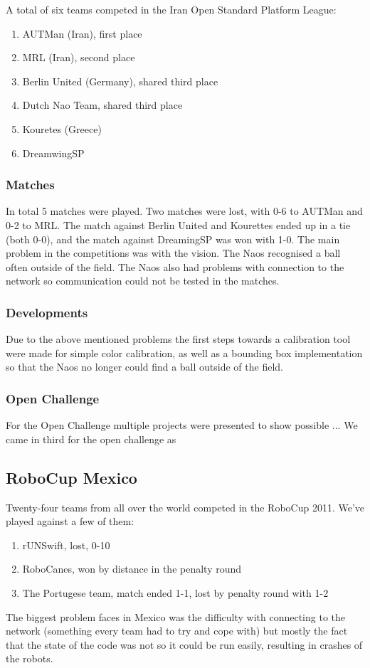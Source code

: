 \documentclass[11pt,a4paper,oneside]{article}
\begin{document}
A total of six teams competed in the Iran Open Standard Platform League:
\begin{enumerate}
\item AUTMan (Iran), first place
\item MRL (Iran), second place
\item Berlin United (Germany), shared third place
\item Dutch Nao Team, shared third place
\item Kouretes (Greece)
\item DreamwingSP
\end{enumerate}

\subsubsection{Matches}
In total 5 matches were played. Two matches were lost, with 0-6 to AUTMan and 0-2 to MRL. The match against Berlin United and Kourettes ended up in a tie (both 0-0), and the match against DreamingSP was won with 1-0.
The main problem in the competitions was with the vision. The Naos recognised a ball often outside of the field. The Naos also had problems with connection to the network so communication could not be tested in the matches.

\subsubsection{Developments}
Due to the above mentioned problems the first steps towards a calibration tool were made for simple color calibration, as well as a bounding box implementation so that the Naos no longer could find a ball outside of the field.

\subsubsection{Open Challenge}
\label{sec:zoneblocking}

For the Open Challenge multiple projects were presented to show  possible ...
We came in third for the open challenge as 

\subsection{RoboCup Mexico}

Twenty-four teams from all over the world competed in the RoboCup 2011. We've played against a few of them:
\begin{enumerate}
\item rUNSwift, lost, 0-10
\item RoboCanes, won by distance in the penalty round
\item The Portugese team, match ended 1-1, lost by penalty round with 1-2
\end{enumerate}
The biggest problem faces in Mexico was the difficulty with connecting to the network (something every team had to try and cope with) but mostly the fact that the state of the code was not so it could be run easily, resulting in crashes of the robots.
\end{document}
